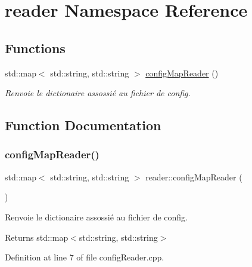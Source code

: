 \hypertarget{namespacereader}{}\section{reader Namespace Reference}
\label{namespacereader}
\subsection*{Functions}
\begin{DoxyCompactItemize}
\item 
std\+::map$<$ std\+::string, std\+::string $>$ \hyperlink{namespacereader_aec55c7af99bc3f269fbd6146f2fcfc84}{config\+Map\+Reader} ()
\begin{DoxyCompactList}\small\item\em Renvoie le dictionaire assossié au fichier de config. \end{DoxyCompactList}\end{DoxyCompactItemize}


\subsection{Function Documentation}
\mbox{\label{namespacereader_aec55c7af99bc3f269fbd6146f2fcfc84}} 
\subsubsection{\texorpdfstring{config\+Map\+Reader()}{configMapReader()}}
{\footnotesize\ttfamily std\+::map$<$ std\+::string, std\+::string $>$ reader\+::config\+Map\+Reader (\begin{DoxyParamCaption}{ }\end{DoxyParamCaption})}



Renvoie le dictionaire assossié au fichier de config. 

\begin{DoxyReturn}{Returns}
std\+::map$<$std\+::string, std\+::string$>$ 
\end{DoxyReturn}


Definition at line 7 of file config\+Reader.\+cpp.

